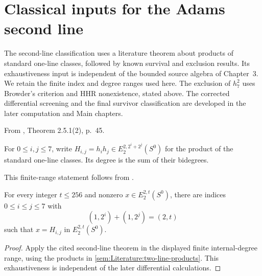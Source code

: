 \section{Classical inputs for the Adams second line}
The second-line classification uses a literature theorem about products
of standard one-line classes, followed by known survival and exclusion
results. Its exhaustiveness input is independent of the bounded source
algebra of Chapter~3. We retain the finite index and degree ranges used
here. The exclusion of $h_7^2$ uses Browder's criterion and HHR
nonexistence, stated above. The corrected differential screening
and the final survivor classification are developed in the later
computation and Main chapters.

\begin{definition}
\label{sem:Literature:two-line-products}
From \cite{Adams60}, Theorem 2.5.1(2), p.~45.\par

For $0\leq i,j\leq7$, write
$H_{i,j}=h_i h_j\in E_2^{2,2^i+2^j}(S^0)$ for the product of the
standard one-line classes. Its degree is the sum of their bidegrees.

\end{definition}

\begin{theorem}
\label{sem:E2Computation:two-line-exhaustive}
This finite-range statement follows from \cite[Theorem 2.5.1(2), p.~45]{Adams60}.\par

For every integer $t\leq256$ and nonzero $x\in E_2^{2,t}(S^0)$,
there are indices $0\leq i\leq j\leq7$ with
\[
 (1,2^i)+(1,2^j)=(2,t)
\]
such that $x=H_{i,j}$ in $E_2^{2,t}(S^0)$.


\end{theorem}
\begin{proof}
Apply the cited second-line theorem in the displayed finite internal-degree
range, using the products in \ref{sem:Literature:two-line-products}.
This exhaustiveness is independent of the later differential calculations.
\end{proof}

